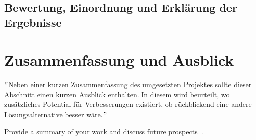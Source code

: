 \documentclass[course=erap]{aspdoc}
\begin{document}
\subsection{Bewertung, Einordnung und Erklärung der Ergebnisse}



\section{Zusammenfassung und Ausblick}
\("\)Neben einer kurzen Zusammenfassung des umgesetzten Projektes sollte dieser Abschnitt einen kurzen Ausblick enthalten.
In diesem wird beurteilt, wo zusätzliches Potential für Verbesserungen existiert, ob rückblickend eine andere
Lösungsalternative besser wäre.\("\)

Provide a summary of your work and discuss future prospects~\cite{intel2017man}.




{}
\end{document}
